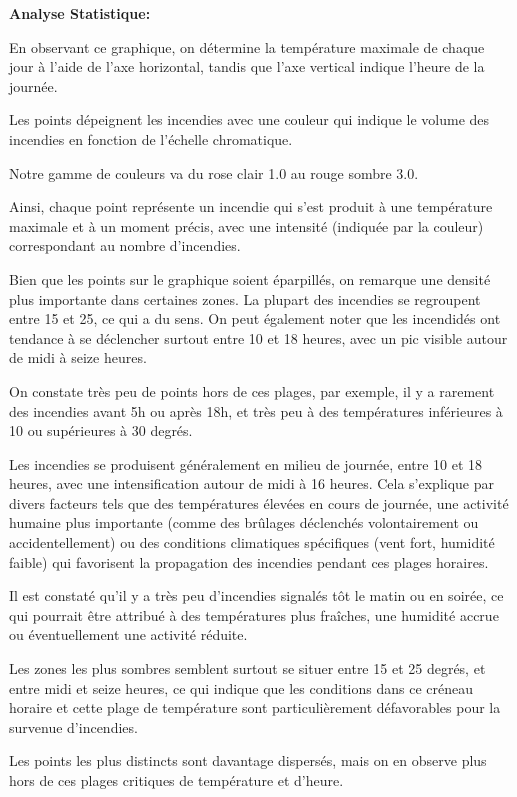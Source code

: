\documentclass[
]{article}
\begin{document}
\textbf{Analyse Statistique:}

En observant ce graphique, on détermine la température maximale de
chaque jour à l'aide de l'axe horizontal, tandis que l'axe vertical
indique l'heure de la journée.

Les points dépeignent les incendies avec une couleur qui indique le
volume des incendies en fonction de l'échelle chromatique.

Notre gamme de couleurs va du rose clair 1.0 au rouge sombre 3.0.

Ainsi, chaque point représente un incendie qui s'est produit à une
température maximale et à un moment précis, avec une intensité (indiquée
par la couleur) correspondant au nombre d'incendies.

Bien que les points sur le graphique soient éparpillés, on remarque une
densité plus importante dans certaines zones. La plupart des incendies
se regroupent entre 15 et 25, ce qui a du sens. On peut également noter
que les incendidés ont tendance à se déclencher surtout entre 10 et 18
heures, avec un pic visible autour de midi à seize heures.

On constate très peu de points hors de ces plages, par exemple, il y a
rarement des incendies avant 5h ou après 18h, et très peu à des
températures inférieures à 10 ou supérieures à 30 degrés.

Les incendies se produisent généralement en milieu de journée, entre 10
et 18 heures, avec une intensification autour de midi à 16 heures. Cela
s'explique par divers facteurs tels que des températures élevées en
cours de journée, une activité humaine plus importante (comme des
brûlages déclenchés volontairement ou accidentellement) ou des
conditions climatiques spécifiques (vent fort, humidité faible) qui
favorisent la propagation des incendies pendant ces plages horaires.

Il est constaté qu'il y a très peu d'incendies signalés tôt le matin ou
en soirée, ce qui pourrait être attribué à des températures plus
fraîches, une humidité accrue ou éventuellement une activité réduite.

Les zones les plus sombres semblent surtout se situer entre 15 et 25
degrés, et entre midi et seize heures, ce qui indique que les conditions
dans ce créneau horaire et cette plage de température sont
particulièrement défavorables pour la survenue d'incendies.

Les points les plus distincts sont davantage dispersés, mais on en
observe plus hors de ces plages critiques de température et d'heure.
\end{document}
